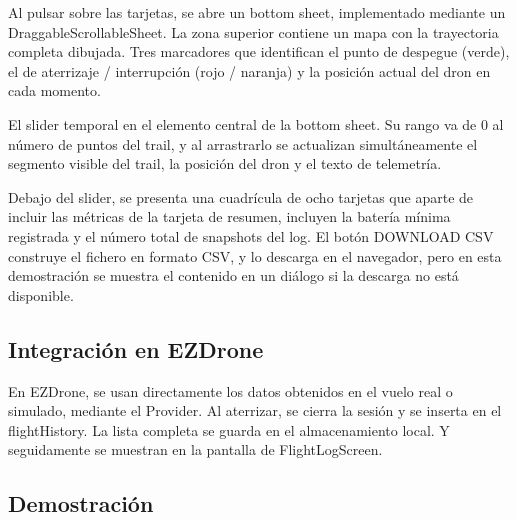 Al pulsar sobre las tarjetas, se abre un bottom sheet, implementado mediante un DraggableScrollableSheet. La zona superior contiene un mapa con la trayectoria completa dibujada. Tres marcadores que identifican el punto de despegue (verde), el de aterrizaje / interrupción (rojo / naranja) y la posición actual del dron en cada momento.

El slider temporal en el elemento central de la bottom sheet. Su rango va de 0 al número de puntos del trail, y al arrastrarlo se actualizan simultáneamente el segmento visible del trail, la posición del dron y el texto de telemetría. 

Debajo del slider, se presenta una cuadrícula de ocho tarjetas que aparte de incluir las métricas de la tarjeta de resumen, incluyen la batería mínima registrada y el número total de snapshots del log. El botón DOWNLOAD CSV construye el fichero en formato CSV, y lo descarga en el navegador, pero en esta demostración se muestra el contenido en un diálogo si la descarga no está disponible.

\subsection{Integración en EZDrone}
En EZDrone, se usan directamente los datos obtenidos en el vuelo real o simulado, mediante el Provider. Al aterrizar, se cierra la sesión y se inserta en el flightHistory. La lista completa se guarda en el almacenamiento local. Y seguidamente se muestran en la pantalla de FlightLogScreen.

\subsection{Demostración}


